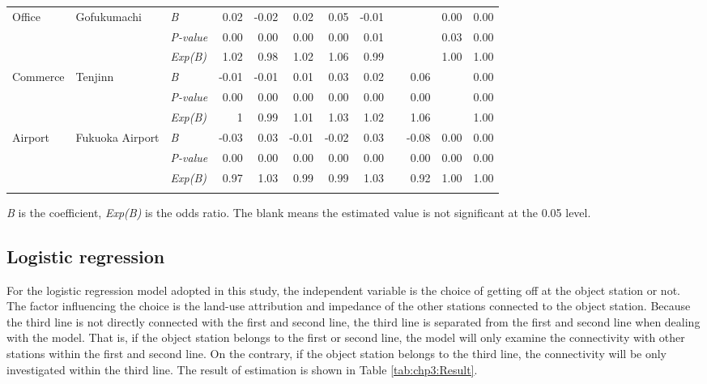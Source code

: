 \begin{sidewaystable}[htbp]
\begin{tabular}{p{7em}p{5em}p{5em}<{\centering}rrrrrrrrr}
		\multirow{3}[0]{7em}{Office} & \multirow{3}[0]{5em}{Gofukumachi} & \textsl{B} & 0.02 & -0.02 & 0.02 & 0.05 & -0.01 & & & 0.00 & 0.00 \\
		& & \textsl{P-value} & 0.00 & 0.00 & 0.00 & 0.00 & 0.01 & & & 0.03 & 0.00 \\
		& & \textsl{Exp(B)} & 1.02 & 0.98 & 1.02 & 1.06 & 0.99 & & & 1.00 & 1.00 \\
		\midrule
		
		\multirow{3}[0]{7em}{Commerce} & \multirow{3}[0]{5em}{Tenjinn} & \textsl{B} & -0.01 & -0.01 & 0.01  & 0.03  & 0.02  & & 0.06 & & 0.00 \\
		& & \textsl{P-value} & 0.00 & 0.00 & 0.00 & 0.00  & 0.00 & & 0.00 & & 0.00 \\
		& & \textsl{Exp(B)} & 1 & 0.99 & 1.01 & 1.03 & 1.02 & & 1.06 & & 1.00 \\
		\midrule
		
		\multirow{3}[0]{7em}{Airport} & \multirow{3}[0]{5em}{Fukuoka Airport} & \textsl{B} & -0.03 & 0.03 & -0.01 & -0.02 & 0.03 & & -0.08 & 0.00 & 0.00 \\
		& & \textsl{P-value} & 0.00 & 0.00 & 0.00 & 0.00 & 0.00 & & 0.00 & 0.00 & 0.00 \\
		& & \textsl{Exp(B)} & 0.97 & 1.03 & 0.99 & 0.99 & 1.03 & & 0.92 & 1.00 & 1.00 \\
		\Xhline{1.5pt}
		
	\end{tabular}%
	\begin{description}
		\label{note:tab:chp3:Result}
		\item[Note:] \textsl{B} is the coefficient, \textsl{Exp(B)} is the odds ratio. The blank means the estimated value is not significant at the 0.05 level.
	\end{description}
	
\end{sidewaystable}%

\subsection{Logistic regression}
%
For the logistic regression model adopted in this study, the independent variable is the choice of getting off at the object station or not. The factor influencing the choice is the land-use attribution and impedance of the other stations connected to the object station. Because the third line is not directly connected with the first and second line, the third line is separated from the first and second line when dealing with the model. That is, if the object station belongs to the first or second line, the model will only examine the connectivity with other stations within the first and second line. On the contrary, if the object station belongs to the third line, the connectivity will be only investigated within the third line. The result of estimation is shown in Table \ref{tab:chp3:Result}.


